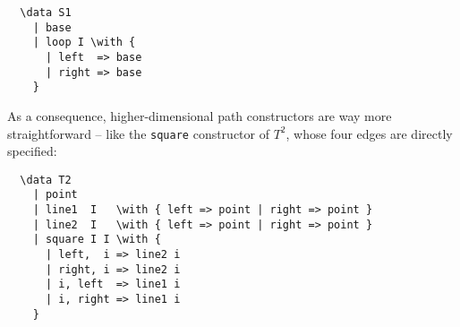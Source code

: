 \begin{verbatim}
  \data S1
    | base
    | loop I \with {
      | left  => base
      | right => base
    }
\end{verbatim}

As a consequence, higher-dimensional path constructors are way more
straightforward -- like the \texttt{square} constructor of $T^2$,
whose four edges are directly specified:

\begin{verbatim}
  \data T2
    | point
    | line1  I   \with { left => point | right => point }
    | line2  I   \with { left => point | right => point }
    | square I I \with {
      | left,  i => line2 i
      | right, i => line2 i
      | i, left  => line1 i
      | i, right => line1 i
    }
\end{verbatim}


